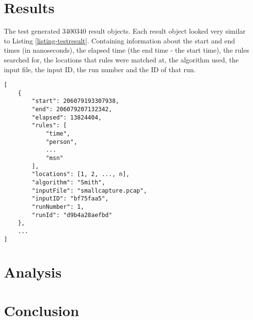 \documentclass[11pt]{article}
\begin{document}
\section{Results}

The test generated 3400340 result objects. Each result object looked very similar to Listing \ref{listing-testresult}. Containing information about the start and end times (in nanoseconds), the elapsed time (the end time - the start time), the rules searched for, the locations that rules were matched at, the algorithm used, the input file, the input ID, the run number and the ID of that run.

\begin{lstlisting}[caption = {Sample test Result}, label = {listing-testresult}]
[
    {
        "start": 206079193307938,
        "end": 206079207132342,
        "elapsed": 13824404,
        "rules": [
            "time",
            "person",
            ...
            "msn"
        ],
        "locations": [1, 2, ..., n],
        "algorithm": "Smith",
        "inputFile": "smallcapture.pcap",
        "inputID": "bf75faa5",
        "runNumber": 1,
        "runId": "d9b4a28aefbd"
    },
    ...
]
\end{lstlisting}

\section{Analysis}

\section{Conclusion}



\end{document}
